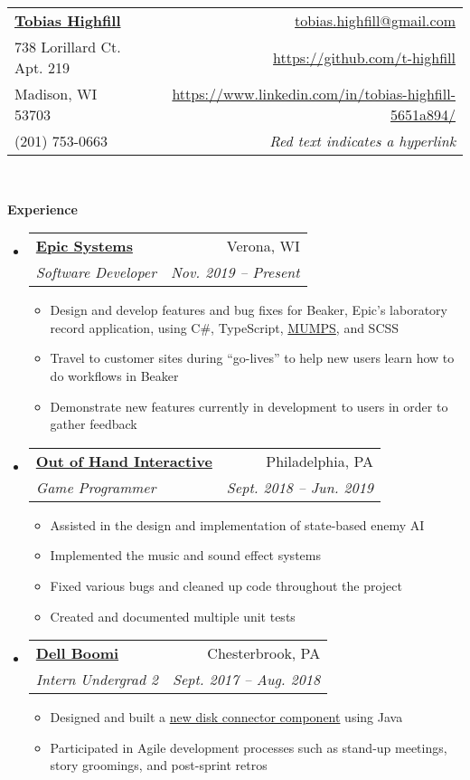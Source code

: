 \documentclass[letterpaper,11pt]{article}
\makeatletter
\newcommand{\resitem}[1]{\item #1 \vspace{-2pt}}
\newcommand{\resheading}[1]{{\large \colorbox{mygrey}{\begin{minipage}{\textwidth}{\textbf{#1 \vphantom{p\^{E}}}}\end{minipage}}}}
\newcommand{\ressubheading}[4]{
\begin{tabular*}{6.5in}{l@{\extracolsep{\fill}}r}
		\textbf{#1} & #2 \\
		\textit{#3} & \textit{#4} \\
\end{tabular*}\vspace{-6pt}}
\newcommand{\myemail}{tobias.highfill@gmail.com}
\newcommand{\mywebsite}{https://github.com/t-highfill}
\newcommand{\linkedin}{https://www.linkedin.com/in/tobias-highfill-5651a894/}
\newcommand{\smallsect}[1]{{\footnotesize #1}}
\makeatother
\begin{document}
\newcommand{\myheader}{
\begin{tabular*}{7in}{l@{\extracolsep{\fill}}r}
	\textbf{\href{\mywebsite}{\LARGE Tobias Highfill}} & \href{mailto:\myemail}{\myemail}\\
	738 Lorillard Ct. Apt. 219 & \href{\mywebsite}{\mywebsite} \\
	Madison, WI 53703 & \href{\linkedin}{\linkedin} \\
	(201) 753-0663 & \smallsect{\textit{Red text indicates a hyperlink}} \\
	\end{tabular*}
\\
\vspace{0.1in}}

\myheader

\resheading{Experience}
\begin{itemize}
	\item \ressubheading{\href{https://www.epic.com/}{Epic Systems}}{Verona, WI}{Software Developer}{Nov. 2019 -- Present}
		\smallsect{
		\begin{itemize}
			\resitem{Design and develop features and bug fixes for Beaker, Epic's laboratory record application, using C\#, TypeScript, \href{https://en.wikipedia.org/wiki/MUMPS}{MUMPS}, and SCSS}
			\resitem{Travel to customer sites during ``go-lives'' to help new users learn how to do workflows in Beaker}
			\resitem{Demonstrate new features currently in development to users in order to gather feedback}
		\end{itemize}
		}
	\item \ressubheading{\href{https://outofhandinteractive.wordpress.com/}{Out of Hand Interactive}}{Philadelphia, PA}{Game Programmer}{Sept. 2018 -- Jun. 2019}
		\smallsect{
		\begin{itemize}
			\resitem{Assisted in the design and implementation of state-based enemy AI}
			\resitem{Implemented the music and sound effect systems}
			\resitem{Fixed various bugs and cleaned up code throughout the project}
			\resitem{Created and documented multiple unit tests}
		\end{itemize}
		}
	\item \ressubheading{\href{https://boomi.com/}{Dell Boomi}}{Chesterbrook, PA}{Intern Undergrad 2}{Sept. 2017 -- Aug. 2018}
		\smallsect{
		\begin{itemize}
			\resitem{Designed and built a \href{https://help.boomi.com/bundle/connectors/page/int-Disk_v2_connector.html}{new disk connector component} using Java}
			\resitem{Participated in Agile development processes such as stand-up meetings, story groomings, and post-sprint retros}

\end{itemize}}
\end{itemize}
\end{document}
